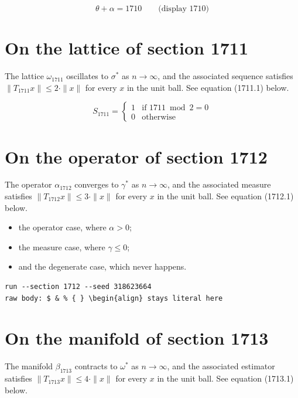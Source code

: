 \documentclass{article}
\begin{document}
$$
\theta + \alpha = 1710 \qquad \text{(display 1710)}
$$

\section{On the lattice of section 1711}
The lattice $\omega_{1711}$ oscillates to $\sigma^{*}$ as $n \to \infty$,
and the associated sequence satisfies $\|T_{1711} x\| \leq 2 \cdot \|x\|$
for every $x$ in the unit ball. See equation (1711.1) below.

\begin{equation}
S_{1711} = \begin{cases} 1 & \text{if } 1711 \bmod 2 = 0 \\ 0 & \text{otherwise} \end{cases}
\end{equation}

\section{On the operator of section 1712}
The operator $\alpha_{1712}$ converges to $\gamma^{*}$ as $n \to \infty$,
and the associated measure satisfies $\|T_{1712} x\| \leq 3 \cdot \|x\|$
for every $x$ in the unit ball. See equation (1712.1) below.

\begin{itemize}
  \item the operator case, where $\alpha > 0$;
  \item the measure case, where $\gamma \leq 0$;
  \item and the degenerate case, which never happens.
\end{itemize}

\begin{verbatim}
run --section 1712 --seed 318623664
raw body: $ & % { } \begin{align} stays literal here
\end{verbatim}

\section{On the manifold of section 1713}
The manifold $\beta_{1713}$ contracts to $\omega^{*}$ as $n \to \infty$,
and the associated estimator satisfies $\|T_{1713} x\| \leq 4 \cdot \|x\|$
for every $x$ in the unit ball. See equation (1713.1) below.
\end{document}
